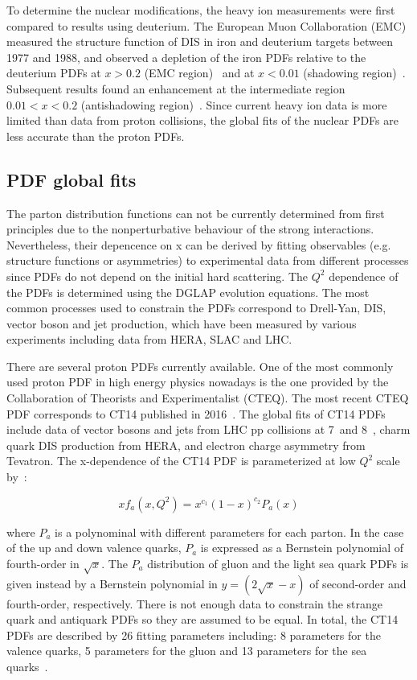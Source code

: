 To determine the nuclear modifications, the heavy ion measurements were first compared to results using deuterium. The European Muon Collaboration (EMC) measured the structure function of DIS in iron and deuterium targets between 1977 and 1988, and observed a depletion of the iron PDFs relative to the deuterium PDFs at $x>0.2$ (EMC region)~\cite{EMCStrucFunc_1} and at $x<0.01$ (shadowing region)~\cite{EMCStrucFunc_2}. Subsequent results found an enhancement at the intermediate region $0.01 < x < 0.2$ (antishadowing region)~\cite{NMCStrucFunc}. Since current heavy ion data is more limited than data from proton collisions, the global fits of the nuclear PDFs are less accurate than the proton PDFs.


\subsection{PDF global fits}

The parton distribution functions can not be currently determined from first principles due to the nonperturbative behaviour of the strong interactions. Nevertheless, their depencence on x can be derived by fitting observables (e.g. structure functions or asymmetries) to experimental data from different processes since PDFs do not depend on the initial hard scattering. The $Q^{2}$ dependence of the PDFs is determined using the DGLAP evolution equations. The most common processes used to constrain the PDFs correspond to Drell-Yan, DIS, vector boson and jet production, which have been measured by various experiments including data from HERA, SLAC and LHC.

There are several proton PDFs currently available. One of the most commonly used proton PDF in high energy physics nowadays is the one provided by the Collaboration of Theorists and Experimentalist (CTEQ). The most recent CTEQ PDF corresponds to CT14 published in 2016~\cite{CT14}. The global fits of CT14 PDFs include data of vector bosons and jets from LHC pp collisions at 7~\TeV and 8~\TeV, charm quark DIS production from HERA, and electron charge asymmetry from Tevatron. The x-dependence of the CT14 PDF is parameterized at low $Q^{2}$ scale by~\cite{CT14}:

\begin{equation}
xf_{a}\left(x, Q^{2}\right) = x^{c_{1}}\left(1-x\right)^{c_{2}}{P_{a}\left(x\right)}
\end{equation}

where $P_{a}$ is a polynominal with different parameters for each parton. In the case of the up and down valence quarks, $P_{a}$ is expressed as a Bernstein polynomial of fourth-order in $\sqrt{x}$. The $P_{a}$ distribution of gluon and the light sea quark PDFs is given instead by a Bernstein polynomial in $y=\left(2\sqrt{x}-x\right)$ of second-order and fourth-order, respectively. There is not enough data to constrain the strange quark and antiquark PDFs so they are assumed to be equal. In total, the CT14 PDFs are described by 26 fitting parameters including: 8 parameters for the valence quarks, 5 parameters for the gluon and 13 parameters for the sea quarks~\cite{CT14}.

